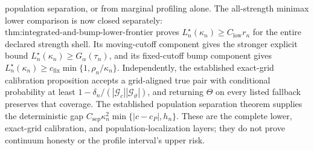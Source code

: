population separation, or from marginal profiling alone.
The all-strength minimax lower comparison is now closed separately:
\(\text{thm:integrated-and-bump-lower-frontier}\) proves
\(L_n^\star(\kappa_n)\ge C_{\mathrm{low}}r_n\) for the entire declared
strength shell.  Its moving-cutoff component gives the stronger explicit
bound \(L_n^\star(\kappa_n)\ge G_\alpha(\tau_n)\), and its fixed-cutoff
bump component gives
\(L_n^\star(\kappa_n)\ge c_{\mathrm{fix}}
\min\{1,\rho_n/\kappa_n\}\).  Independently, the established exact-grid
calibration proposition accepts a grid-aligned true pair with conditional
probability at least
\(1-\delta_n/(|\mathcal G_c||\mathcal G_\vartheta|)\), and returning
\(\Theta\) on every listed fallback preserves that coverage.  The
established population separation theorem supplies the deterministic gap
\(C_{\mathrm{sep}}\kappa_n^2\min\{|c-c_P|,h_n\}\).  These are the complete
lower, exact-grid calibration, and population-localization layers; they
do not prove continuum honesty or the profile interval's upper risk.
